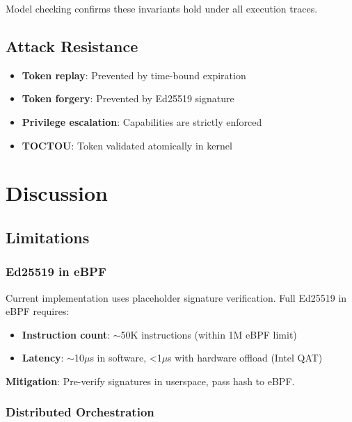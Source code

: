 \documentclass[11pt,a4paper]{article}
\begin{document}
Model checking confirms these invariants hold under all execution traces.

\subsection{Attack Resistance}

\begin{itemize}
    \item \textbf{Token replay}: Prevented by time-bound expiration
    \item \textbf{Token forgery}: Prevented by Ed25519 signature
    \item \textbf{Privilege escalation}: Capabilities are strictly enforced
    \item \textbf{TOCTOU}: Token validated atomically in kernel
\end{itemize}

\section{Discussion}
\label{sec:discussion}

\subsection{Limitations}

\subsubsection{Ed25519 in eBPF}

Current implementation uses placeholder signature verification. Full Ed25519 in eBPF requires:
\begin{itemize}
    \item \textbf{Instruction count}: $\sim$50K instructions (within 1M eBPF limit)
    \item \textbf{Latency}: $\sim$10$\mu$s in software, <1$\mu$s with hardware offload (Intel QAT)
\end{itemize}

\textbf{Mitigation}: Pre-verify signatures in userspace, pass hash to eBPF.

\subsubsection{Distributed Orchestration}
\end{document}
